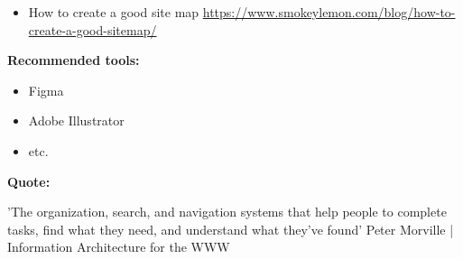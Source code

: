 \begin{itemize}
\item How to create a good site map \url{https://www.smokeylemon.com/blog/how-to-create-a-good-sitemap/}
\end{itemize}

\textbf{Recommended tools:}

\begin{itemize}
\item Figma
\item Adobe Illustrator
\item etc.
\end{itemize}

\textbf{Quote:}

'The organization, search, and navigation systems that help people to complete tasks, find what they need, and understand what they've found' Peter Morville | Information Architecture for the WWW

